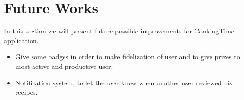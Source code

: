 \chapter{Future Works}
In this section we will present future possible improvements for CookingTime application.
\begin{itemize}
	\item Give some badges in order to make fidelization of user and to give prizes to most active and productive user.
	\item Notification system, to let the user know when another user reviewed his recipes.
\end{itemize}
